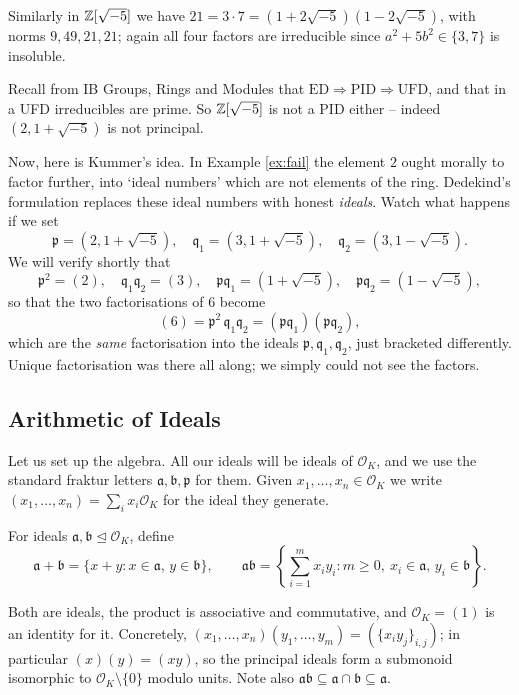 \documentclass[a4paper]{scrartcl}
\renewcommand{\OO}{\mathcal{O}}
\newcommand{\fa}{\mathfrak{a}}
\newcommand{\fb}{\mathfrak{b}}
\newcommand{\fp}{\mathfrak{p}}
\newcommand{\fq}{\mathfrak{q}}
\begin{document}
\begin{example}\label{ex:fail2}
	Similarly in $\mathbb{Z}[\sqrt{-5}]$ we have $21 = 3 \cdot 7 = (1+2\sqrt{-5})(1-2\sqrt{-5})$, with norms $9, 49, 21, 21$; again all four factors are irreducible since $a^2+5b^2 \in \{3,7\}$ is insoluble.
\end{example}

Recall from IB Groups, Rings and Modules that $\text{ED} \Rightarrow \text{PID} \Rightarrow \text{UFD}$, and that in a UFD irreducibles are prime. So $\mathbb{Z}[\sqrt{-5}]$ is not a PID either -- indeed $(2, 1+\sqrt{-5})$ is not principal.

Now, here is Kummer's idea. In Example \ref{ex:fail} the element $2$ ought morally to factor further, into `ideal numbers' which are not elements of the ring. Dedekind's formulation replaces these ideal numbers with honest \emph{ideals}. Watch what happens if we set
$$\fp = (2, 1+\sqrt{-5}), \quad \fq_1 = (3, 1+\sqrt{-5}), \quad \fq_2 = (3, 1-\sqrt{-5}).$$
We will verify shortly that
$$\fp^2 = (2), \quad \fq_1\fq_2 = (3), \quad \fp\fq_1 = (1+\sqrt{-5}), \quad \fp\fq_2 = (1-\sqrt{-5}),$$
so that the two factorisations of $6$ become
$$(6) = \fp^2\,\fq_1\fq_2 = (\fp\fq_1)(\fp\fq_2),$$
which are the \emph{same} factorisation into the ideals $\fp, \fq_1, \fq_2$, just bracketed differently. Unique factorisation was there all along; we simply could not see the factors.

\subsection{Arithmetic of Ideals}

Let us set up the algebra. All our ideals will be ideals of $\OO_K$, and we use the standard fraktur letters $\fa, \fb, \fp$ for them. Given $x_1, \dots, x_n \in \OO_K$ we write $(x_1, \dots, x_n) = \sum_i x_i \OO_K$ for the ideal they generate.

\begin{definition}
	For ideals $\fa, \fb \trianglelefteq \OO_K$, define
	$$\fa + \fb = \{x + y : x \in \fa,\, y \in \fb\}, \qquad \fa\fb = \left\{\textstyle\sum_{i=1}^m x_iy_i : m \geq 0,\ x_i \in \fa,\, y_i \in \fb\right\}.$$
\end{definition}

Both are ideals, the product is associative and commutative, and $\OO_K = (1)$ is an identity for it. Concretely, $(x_1,\dots,x_n)(y_1,\dots,y_m) = (\{x_iy_j\}_{i,j})$; in particular $(x)(y) = (xy)$, so the principal ideals form a submonoid isomorphic to $\OO_K \setminus\{0\}$ modulo units. Note also $\fa\fb \subseteq \fa \cap \fb \subseteq \fa$.
\end{document}

